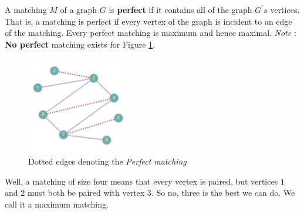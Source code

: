 A matching $M$ of a graph $G$ is \textbf{perfect} if it contains all of the graph $G^\prime s$ vertices. 
That is, a matching is perfect if every vertex of the graph is incident to an edge of the matching. Every perfect matching is maximum and hence maximal.
\newline
\textit{Note} : \textbf{No perfect} matching exists for Figure \ref{FIG_1_4}.
\begin{figure}[ht]
\begin{center}
  \includegraphics[width=0.4\textwidth]{IMAGES_FIGS/FIG_1_4.png}
  \caption{Dotted edges denoting the \textit{Perfect matching}}
  \label{FIG_1_4}
  \end{center}
  
\end{figure}

Well, a matching of size four means that every vertex is paired, but vertices $1$ and $2$ must both be paired with vertex $3$. So no, three is the best we can do. We call it a maximum matching.
 